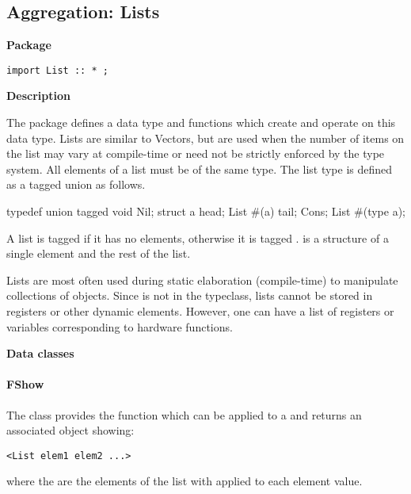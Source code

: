 \subsection{Aggregation: Lists}

\label{lib-list}


{\bf Package}

\begin{verbatim}
import List :: * ;
\end{verbatim}


{\bf Description}


The {}  package defines a data type and functions which create and operate
on this data type. Lists are similar
to Vectors, but are used when the number of items on the list may vary
at compile-time or need not be strictly enforced by the type system.
All elements of a list must be  of the same type.
 The list type is defined as a tagged union as follows.



\begin{libverbatim}
typedef union tagged {
    void Nil;
    struct {
        a         head;
        List #(a) tail;
    } Cons;
} List #(type a);
\end{libverbatim}

A list is tagged  if it has no elements, otherwise it is
tagged .   is a structure of a single element and
the rest of the list.

Lists are most often used during static elaboration (compile-time) to manipulate
collections of objects.  Since  is not in the
 typeclass, lists cannot be stored in registers or other
dynamic elements.  However, one can have a list of registers or
variables corresponding to hardware functions.

{\bf Data classes}

\paragraph{FShow}

The  class provides the function  which can be
applied to a  and returns an associated   object showing:

\begin{verbatim}
<List elem1 elem2 ...>
\end{verbatim}
where the  are the elements of the list with 
applied to each element value.



